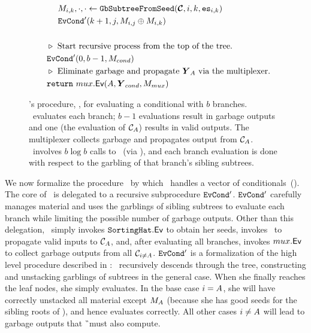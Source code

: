\begin{figure}
\begin{align*}
    &~~~~~~\mat_{i, k}, \cdot, \cdot \gets \gbtree(\vec{\cir}, i, k, \es_{i,k})\\
    &~~~~~~\evcond'(k+1, j, \mat_{i, j} \oplus \mat_{i, k})\\
    \\
    &~~\codecomment{Start recursive process from the top of the tree.}\\
    &~~\evcond'(0, b-1, M_{cond})\\
    &~~\codecomment{Eliminate garbage and propagate $\vec{Y}_\aid$ via
    the multiplexer.}\\
    &~~\creturn~\evmux(\aid, \vec{Y}_{cond}, M_{mux})
  \end{align*}
  \caption{%
    \E's procedure, \evcond, for evaluating a conditional with $b$ branches.
    \evcond\ evaluates each branch; $b-1$ evaluations
    result in garbage outputs and one (the evaluation of
    $\mathcal C_{A}$) results in valid outputs.
    The multiplexer collects garbage and propagates output from
    $\mathcal C_{A}$.
    \evcond\ involves $b \log b$ calls to \gGb\ (via \gbtree), and each
    branch evaluation is done with respect to the garbling of that
    branch's sibling subtrees.
  }\label{fig:evcond}
\end{figure}

We now formalize the procedure \evcond\ by which \E\ handles a vector of
conditionals~().
%
The core of \evcond\ is delegated to a recursive subprocedure $\mathtt{EvCond}'$.
$\mathtt{EvCond}'$ carefully manages material and uses the garblings of sibling
subtrees to evaluate each branch while limiting the possible number of
garbage outputs.
Other than this delegation, \evcond\ simply invokes $\mathtt{SortingHat}.\textsf{Ev}$
to obtain her seeds, invokes \evdem\ to propagate valid inputs to $\mathcal C_{A}$,
and, after evaluating all branches, invokes $mux.\textsf{Ev}$ to collect
garbage outputs from all $\mathcal C_{i \neq A}$.
%
$\mathtt{EvCond}'$ is a formalization of the high level procedure described in
: \E\ recursively descends through the tree,
constructing and unstacking garblings of subtrees in the general case.
%
When she finally reaches the leaf nodes, she simply evaluates.
%
In the base case $i = A$, she will have correctly unstacked all
material except $M_{A}$ (because she has good seeds for the
sibling roots of \aid), and hence evaluates correctly.
%
All other cases $i \neq A$ will lead to garbage outputs that \G\
must also compute.


